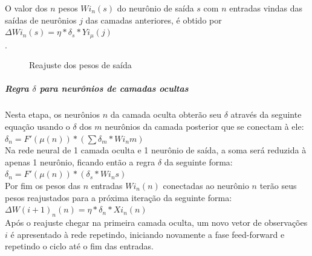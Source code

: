 \documentclass[	12pt, Times, openright, twoside, a4paper, english, brazil]{abntex2}
\begin{document}
            O valor dos $n$ pesos $Wi_{n}(s)$ do neurônio de saída $s$ com $n$ entradas vindas das saídas de neurônios $j$ das camadas anteriores, é obtido por $\Delta Wi_{n}(s) = \eta*\delta_s*Yi_{\mu}(j)$\\.
            \begin{figure}[!ht]
          	\caption{Reajuste dos pesos de saída}
           \end{figure}
           \subparagraph*{Regra $\delta$ para neurônios de camadas ocultas}
            Nesta etapa, os neurônios $n$ da camada oculta obterão seu $\delta$ através da seguinte equação usando o $\delta$ dos $m$ neurônios da camada posterior que se conectam à ele:\\ 
            
            $\delta_n = F'(\mu(n))*(\sum \delta_m*Wi_{n}m)$\\
            
            Na rede neural de 1 camada oculta e 1 neurônio de saída, a soma será reduzida à apenas 1 neurônio, ficando então a regra $\delta$ da seguinte forma:\\
            
            $\delta_n = F'(\mu(n))*(\delta_s*Wi_{n}s)$\\
            
            Por fim os pesos das $n$ entradas $Wi_{n}(n)$ conectadas ao neurônio $n$ terão seus pesos reajustados para a próxima iteração da seguinte forma:\\
            $\Delta W(i+1)_{n}(n) = \eta*\delta_n*Xi_{n}(n)$\\
            
            Após o reajuste chegar na primeira camada oculta, um novo vetor de observações $i$ é apresentado à rede repetindo, iniciando novamente a fase feed-forward e repetindo o ciclo até o fim das entradas.
            
\end{document}

